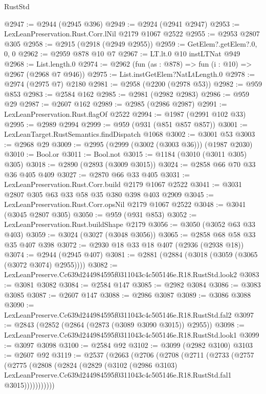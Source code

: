 \begin{lexlean}{RustStd}
\begin{coremodule}
@2947 := @2944 (@2945 @396)
@2949 := @2924 (@2941 @2947)
@2953 := LexLeanPreservation.Rust.Corr.lNil @2179 @1067 @2522
@2955 := @2953 @2807 @305
@2958 := @2915 (@2918 (@2949 @2955))
@2959 := GetElem?.getElem?.{0, 0, 0}
@2962 := @2959 @878 @10 @7
@2967 := LT.lt.{0} @10 instLTNat @949
@2968 := List.length.{0}
@2974 := @2962 (fun (as : @878) => fun (i : @10) => @2967 (@2968 @7 @946))
@2975 := List.instGetElem?NatLtLength.{0}
@2978 := @2974 (@2975 @7) @2180
@2981 := @2958 (@2200 (@2978 @53))
@2982 := @959 @853
@2983 := @2584 @162
@2985 := @2981 (@2982 @2983)
@2986 := @959 @29
@2987 := @2607 @162
@2989 := @2985 (@2986 @2987)
@2991 := LexLeanPreservation.Rust.flagOf @2522
@2994 := @1987 (@2991 @102 @33)
@2995 := @2989 @2994
@2999 := @959 (@931 (@851 @857 @857))
@3001 := LexLeanTarget.RustSemantics.findDispatch @1068
@3002 := @3001 @53
@3003 := @2968 @29
@3009 := @2995 (@2999 (@3002 (@3003 @36))) (@1987 @2030)
@3010 := Bool.or
@3011 := Bool.not
@3015 := @1184 (@3010 (@3011 @305) @305)
@3018 := @2890 (@2893 (@3009 @3015))
@3024 := @2858 @66 @70 @33 @36 @405 @409
@3027 := @2870 @66 @33 @405
@3031 := LexLeanPreservation.Rust.Corr.build @2179 @1067 @2522
@3041 := @3031 @2807 @305 @63 @33 @58 @35 @380 @398 @403 @2909
@3045 := LexLeanPreservation.Rust.Corr.opsNil @2179 @1067 @2522
@3048 := @3041 (@3045 @2807 @305)
@3050 := @959 (@931 @853)
@3052 := LexLeanPreservation.Rust.buildShape @2179
@3056 := @3050 (@3052 @63 @33 @403)
@3059 := @3024 (@3027 (@3048 @3056))
@3065 := @2858 @68 @58 @33 @35 @407 @398
@3072 := @2930 @18 @33 @18 @407 (@2936 (@2938 @18))
@3074 := @2944 (@2945 @407)
@3081 := @2881 (@2884 (@3018 (@3059 (@3065 (@3072 @3074) @2955))))
@3082 := LexLeanPreserve.Cc639d244984595f0311043c4c505146e.R18.RustStd.look2
@3083 := @3081 @3082
@3084 := @2584 @147
@3085 := @2982 @3084
@3086 := @3083 @3085
@3087 := @2607 @147
@3088 := @2986 @3087
@3089 := @3086 @3088
@3090 := LexLeanPreserve.Cc639d244984595f0311043c4c505146e.R18.RustStd.fal2
@3097 := @2843 (@2852 (@2864 (@2873 (@3089 @3090 @3015)) @2955))
@3098 := LexLeanPreserve.Cc639d244984595f0311043c4c505146e.R18.RustStd.look1
@3099 := @3097 @3098
@3100 := @2584 @92
@3102 := @3099 (@2982 @3100)
@3103 := @2607 @92
@3119 := @2537
    (@2663
      (@2706
        (@2708
          (@2711
            (@2733
              (@2757
                (@2775
                  (@2808
                    (@2824
                      (@2829
                        (@3102
                          (@2986 @3103)
                          LexLeanPreserve.Cc639d244984595f0311043c4c505146e.R18.RustStd.fal1
                          @3015)))))))))))

\end{coremodule}
\end{lexlean}
